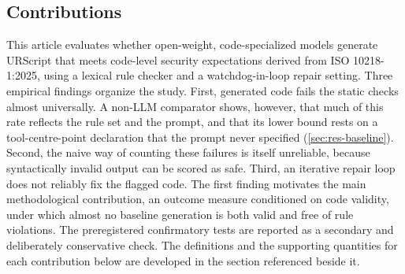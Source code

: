 \documentclass{ieeeaccess}
\begin{document}
\subsection{Contributions}\label{sec:contribution}
This article evaluates whether open-weight, code-specialized models generate
URScript that meets code-level security expectations derived from ISO 10218-1:2025,
using a lexical rule checker and a watchdog-in-loop repair setting. Three empirical
findings organize the study. First, generated code fails the static checks almost
universally. A non-LLM comparator shows, however, that much of this rate reflects the rule
set and the prompt, and that its lower bound rests on a tool-centre-point declaration that
the prompt never specified (\ref{sec:res-baseline}). Second, the naive way of counting
these failures is itself unreliable, because syntactically invalid output can be scored as
safe. Third, an iterative repair loop does not reliably fix the flagged code. The first finding motivates the main
methodological contribution, an outcome measure conditioned on code validity, under
which almost no baseline generation is both valid and free of rule violations. The
preregistered confirmatory tests are reported as a secondary and deliberately
conservative check. The definitions and the supporting quantities for each
contribution below are developed in the section referenced beside it.
\end{document}
